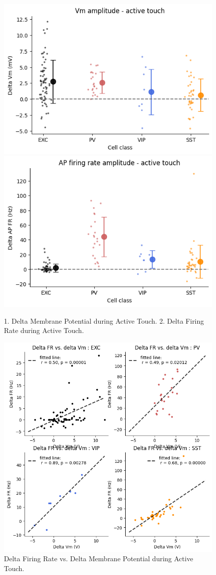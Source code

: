 \documentclass{IEEEtran}
\begin{document}
\begin{figure}[h!]
  \centering
  \includegraphics[width=0.45\columnwidth]{figures/given/14_delta_Vm_active_touch.png}
  \includegraphics[width=0.45\columnwidth]{figures/given/15_delta_FR_active_touch.png}
  \caption{1. Delta Membrane Potential during Active Touch. 2. Delta Firing Rate during Active Touch.}%
  \label{fig:14_15}
\end{figure}

\begin{figure}[h!]
  \centering
  \includegraphics[width=\columnwidth]{figures/given/16_delta_FRvsdelta_Vm.png}
  \caption{Delta Firing Rate vs. Delta Membrane Potential during Active Touch.}%
  \label{fig:16}
\end{figure}
\end{document}
